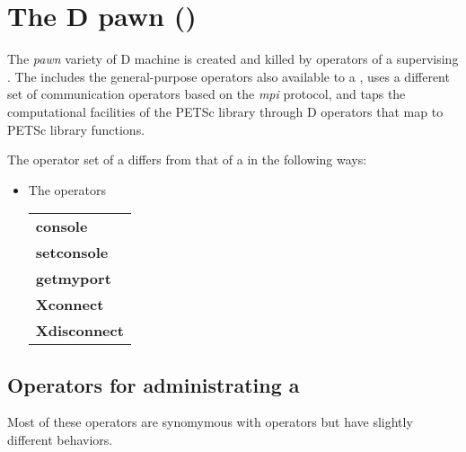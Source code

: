 \section{The D pawn ()}

The \emph{pawn} variety of D machine is created and killed by
operators of a supervising . The  includes the
general-purpose operators also available to a , uses a
different set of communication operators based on the \emph{mpi}
protocol, and taps the computational facilities of the PETSc library
through D operators that map to PETSc library functions.

The operator set of a  differs from that of a
 in the following ways:
\begin{itemize}
\item The operators \\
\begin{tabular}{>{\sffamily\bfseries}l}
console             \\
setconsole          \\
getmyport           \\
Xconnect            \\
Xdisconnect         \\
\end{tabular}
\end{itemize}

\subsection{Operators for administrating a }

Most of these operators are synomymous with  operators but
have slightly different behaviors.

